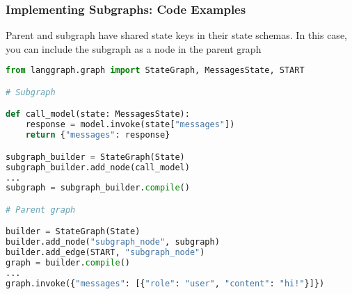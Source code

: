 \begin{frame}[fragile]\frametitle{Implementing Subgraphs: Code Examples}

Parent and subgraph have shared state keys in their state schemas. In this case, you can include the subgraph as a node in the parent graph


\begin{lstlisting}[language=Python, basicstyle=\tiny]
from langgraph.graph import StateGraph, MessagesState, START

# Subgraph

def call_model(state: MessagesState):
    response = model.invoke(state["messages"])
    return {"messages": response}

subgraph_builder = StateGraph(State)
subgraph_builder.add_node(call_model)
...
subgraph = subgraph_builder.compile()

# Parent graph

builder = StateGraph(State)
builder.add_node("subgraph_node", subgraph)
builder.add_edge(START, "subgraph_node")
graph = builder.compile()
...
graph.invoke({"messages": [{"role": "user", "content": "hi!"}]})
      \end{lstlisting}
\end{frame}


